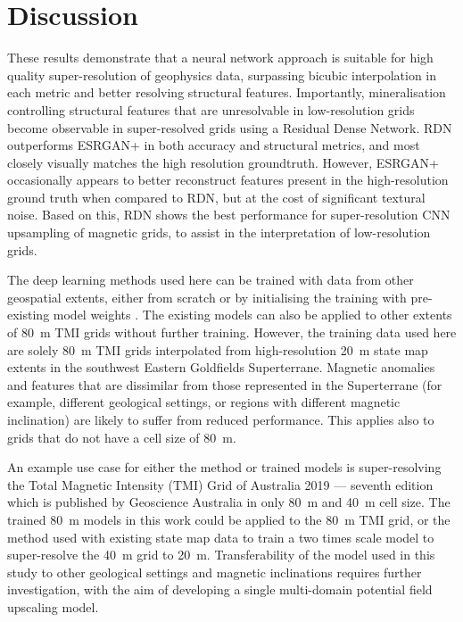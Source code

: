 \section{Discussion}
These results demonstrate that a neural network approach is suitable for high quality super-resolution of geophysics data, surpassing bicubic interpolation in each metric and better resolving structural features.
Importantly, mineralisation controlling structural features that are unresolvable in low-resolution grids become observable in super-resolved grids using a Residual Dense Network.
RDN\textdaggerdbl{} outperforms ESRGAN+ in both accuracy and structural metrics, and most closely visually matches the high resolution groundtruth.
However, ESRGAN+ occasionally appears to better reconstruct features present in the high-resolution ground truth when compared to RDN\textdaggerdbl{}, but at the cost of significant textural noise.
Based on this, RDN\textdaggerdbl{} shows the best performance for super-resolution CNN upsampling of magnetic grids, to assist in the interpretation of low-resolution grids.

The deep learning methods used here can be trained with data from other geospatial extents, either from scratch or by initialising the training with pre-existing model weights \parencite[e.g.][]{wangMineGANEffectiveKnowledge2020}.
The existing models can also be applied to other extents of \qty{80}{\metre} TMI grids without further training.
However, the training data used here are solely \qty{80}{\metre} TMI grids interpolated from high-resolution \qty{20}{\metre} state map extents in the southwest Eastern Goldfields Superterrane.
Magnetic anomalies and features that are dissimilar from those represented in the Superterrane (for example, different geological settings, or regions with different magnetic inclination) are likely to suffer from reduced performance.
This applies also to grids that do not have a cell size of \qty{80}{\metre}.

An example use case for either the method or trained models is super-resolving the Total Magnetic Intensity (TMI) Grid of Australia 2019 --- seventh edition which is published by Geoscience Australia in only \qty{80}{\metre} and \qty{40}{\metre} cell size.
The trained \qty{80}{\metre} models in this work could be applied to the \qty{80}{\metre} TMI grid, or the method used with existing state map data to train a two times scale model to super-resolve the \qty{40}{\metre} grid to \qty{20}{\metre}.
Transferability of the model used in this study to other geological settings and magnetic inclinations requires further investigation, with the aim of developing a single multi-domain potential field upscaling model.

